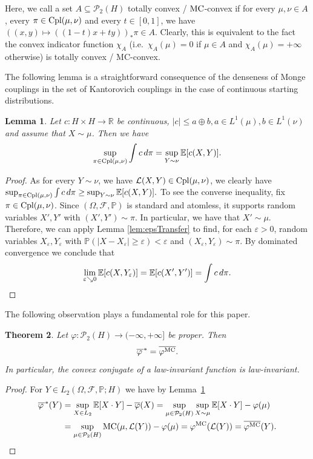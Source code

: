 \documentclass[a4paper]{amsart}
\newtheorem{theorem}{Theorem}
\numberwithin{theorem}{section}
\newtheorem{lemma}[theorem]{Lemma}
\theoremstyle{definition}
\newcommand{\R}{\mathbb{R}}
\newcommand{\E}{\mathbb{E}}
\newcommand{\F}{\mathcal{F}}
\newcommand{\law}{\mathcal{L}}
\newcommand{\cpl}{\textup{Cpl}}
\newcommand{\Pc}{\mathcal P}
\renewcommand{\epsilon}{\varepsilon}
\renewcommand{\subset}{\subseteq}
\renewcommand{\P}{\mathbb{P}}
\renewcommand{\H}{H}
\renewcommand{\phi}{\varphi}
\newcommand{\mc}{\textup{MC}}
\begin{document}
Here, we call a set $A \subset \Pc_2(\H)$ totally convex / $\mc$-convex if for every $\mu, \nu \in A$, every $\pi \in \cpl(\mu,\nu)$ and every $t \in [0,1]$, we have $( (x,y) \mapsto ((1-t)x+ty) )_\ast \pi \in A$. Clearly, this is equivalent to the fact the convex indicator function $\chi_A$ (i.e.\ $\chi_A(\mu) = 0$ if $\mu \in A$ and $\chi_A(\mu) = + \infty$ otherwise) is totally convex / MC-convex. 

\medskip


The following lemma is a straightforward consequence of the denseness of Monge couplings in the set of Kantorovich couplings in the case of continuous starting distributions. 
\begin{lemma}\label{lem:EnoughRandomization}
    Let $c:  \H \times   \H \to \R $  be continuous, $|c|\leq a\oplus b, a\in L^1 (\mu), b\in L^1(\nu)$ and assume that $X\sim \mu$. Then we have
    \begin{align}\label{eq:lem:EnoughRandomization}
        \sup_{\pi\in \cpl(\mu, \nu) } \int c\, d\pi = \sup_{Y\sim \nu} \E[c(X,Y)].
    \end{align}
\end{lemma}
\begin{proof}
As for every $Y \sim \nu$, we have $\law(X,Y) \in \cpl(\mu,\nu)$, we clearly have $\sup_{\pi\in \cpl(\mu, \nu) } \int c\, d\pi \ge \sup_{Y\sim \nu} \E[c(X,Y)].$ To see the converse inequality, fix $\pi \in \cpl(\mu,\nu)$.
Since $(\Omega,\F,\P)$ is standard and atomless, it supports random variables $X',Y'$ with $(X',Y') \sim \pi$. In particular, we have that $X' \sim \mu$.
Therefore, we can apply Lemma \ref{lem:epsTransfer} to find, for each $\epsilon > 0$, random variables $X_\epsilon,Y_\epsilon$ with $\mathbb P(|X-X_\epsilon| \ge \epsilon) < \epsilon$ and $(X_\epsilon,Y_\epsilon) \sim \pi$. 
By dominated convergence we conclude that
\[
    \lim_{\epsilon\searrow 0} \E[c(X,Y_\epsilon)] = \E[c(X',Y')] = \int c \, d\pi. \qedhere
\]

\end{proof}


The following observation plays a fundamental role for this paper.
\begin{theorem}\label{thm:MCiConvConj}
Let $\phi : \Pc_2(\H) \to (-\infty, +\infty]$ be proper. Then
\[
{\overline{\phi\,}}^\ast = \overline{\phi^{\mc}}.
\]
In particular, the convex conjugate of a law-invariant function is law-invariant. 
\end{theorem}
\begin{proof}
For $Y \in L_2(\Omega,\F,\P;H)$ we have by Lemma~\ref{lem:EnoughRandomization}
\begin{align*}
   \overline{\phi\,}^\ast(Y) &= \sup_{X \in L_2 } \E[ X \cdot Y ] - \overline{\phi}(X) = \sup_{ \mu \in \Pc_2(\H)}  \sup_{X \sim \mu} \E[X \cdot Y]   -  \phi(\mu) \\
   &= \sup_{\mu \in \Pc_2(\H) } \mc(\mu,\law(Y)) - \phi(\mu)  = \phi^{\mc}(\law(Y)) = \overline{\phi^{\mc}}(Y). \qedhere
\end{align*}
\end{proof}
\end{document}
